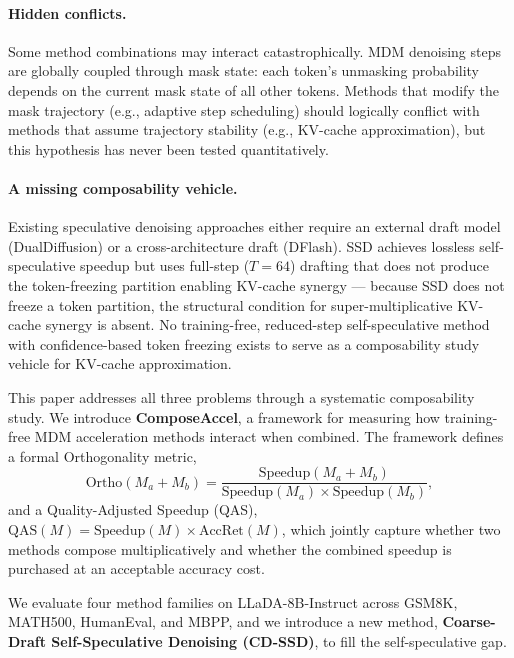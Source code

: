 \documentclass{article}
\newcommand{\ortho}{\text{Ortho}}
\newcommand{\qas}{\text{QAS}}
\newcommand{\speedup}{\text{Speedup}}
\newcommand{\accret}{\text{AccRet}}
\begin{document}
\paragraph{Hidden conflicts.} Some method combinations may interact catastrophically. MDM denoising
steps are globally coupled through mask state: each token's unmasking probability depends on the
current mask state of all other tokens. Methods that modify the mask trajectory (e.g., adaptive step
scheduling) should logically conflict with methods that assume trajectory stability (e.g., KV-cache
approximation), but this hypothesis has never been tested quantitatively.

\paragraph{A missing composability vehicle.} Existing speculative denoising approaches either
require an external draft model (DualDiffusion) or a cross-architecture draft (DFlash). SSD achieves
lossless self-speculative speedup but uses full-step ($T=64$) drafting that does not produce the
token-freezing partition enabling KV-cache synergy --- because SSD does not freeze a token partition,
the structural condition for super-multiplicative KV-cache synergy is absent. No training-free,
reduced-step self-speculative method with confidence-based token freezing exists to serve as a
composability study vehicle for KV-cache approximation.

This paper addresses all three problems through a systematic composability study. We introduce
\textbf{ComposeAccel}, a framework for measuring how training-free MDM acceleration methods interact
when combined. The framework defines a formal Orthogonality metric,
\begin{equation}
  \ortho(M_a + M_b) = \frac{\speedup(M_a + M_b)}{\speedup(M_a) \times \speedup(M_b)},
  \label{eq:ortho}
\end{equation}
and a Quality-Adjusted Speedup (QAS), $\qas(M) = \speedup(M) \times \accret(M)$, which jointly
capture whether two methods compose multiplicatively and whether the combined speedup is purchased
at an acceptable accuracy cost.

We evaluate four method families on LLaDA-8B-Instruct across GSM8K, MATH500, HumanEval, and MBPP,
and we introduce a new method, \textbf{Coarse-Draft Self-Speculative Denoising (CD-SSD)}, to fill
the self-speculative gap.
\end{document}
